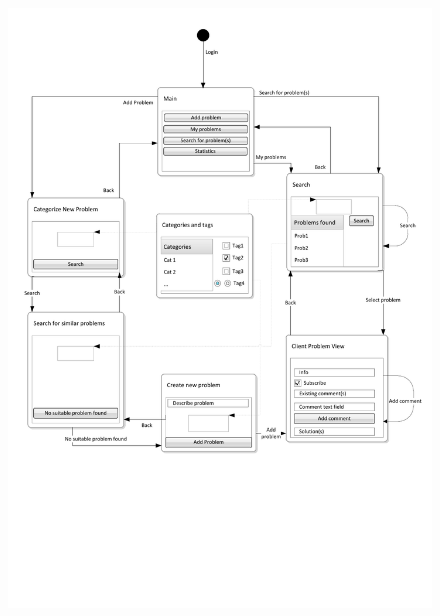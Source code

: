 \begin{figure}[htb]
\begin{center}
 \includegraphics[scale=0.70, clip=true, trim=0 6cm 0 0]{input/application_domain_analysis/client_interface}
\caption{\cinterface[]}
\label{fig:client_interface}
\end{center}
\end{figure}
